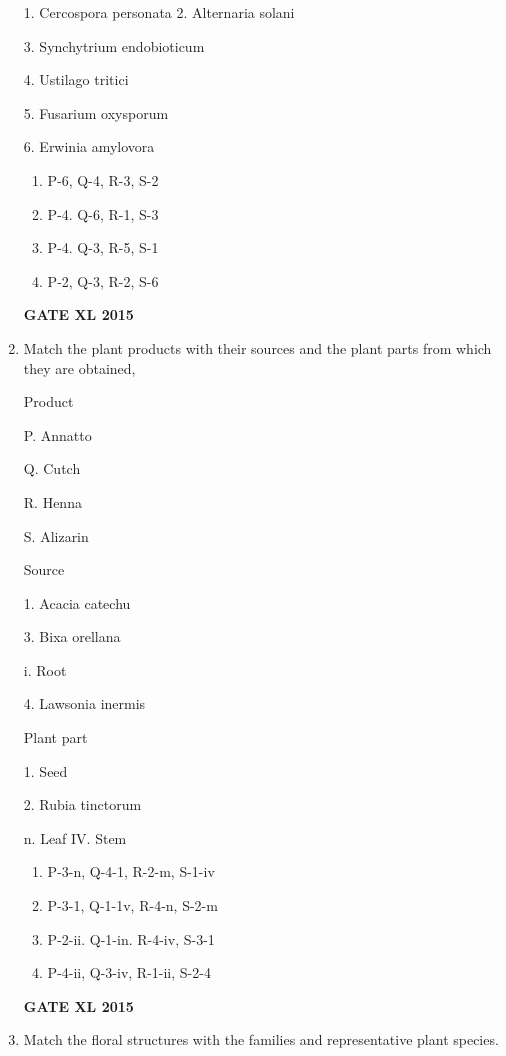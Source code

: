 \documentclass[journal,12pt,onecolumn]{IEEEtran}
\begin{document}
\begin{enumerate}
\begin{minipage}{0.5\textwidth}
\begin{flushleft}
1. Cercospora personata 2. Alternaria solani

3. Synchytrium endobioticum

4. Ustilago tritici

5. Fusarium oxysporum

6. Erwinia amylovora
	\end{flushleft}
\end{minipage}

    \begin{enumerate}
            \item P-6, Q-4, R-3, S-2
	    \item P-4. Q-6, R-1, S-3
	    \item P-4. Q-3, R-5, S-1
            \item P-2, Q-3, R-2, S-6
    \end{enumerate}
\hfill{\textbf{GATE XL 2015}}
\item Match the plant products with their sources and the plant parts from which they are obtained,

\begin{minipage}{0.3\textwidth}
	\begin{flushleft}
Product

P. Annatto

Q. Cutch

R. Henna

S. Alizarin

	\end{flushleft}
\end{minipage}
\begin{minipage}{0.3\textwidth}
	\begin{flushleft}
Source

1. Acacia catechu

3. Bixa orellana

i. Root

4. Lawsonia inermis

	\end{flushleft}
\end{minipage}
\begin{minipage}{0.3\textwidth}
	\begin{flushleft}
Plant part

1. Seed

2. Rubia tinctorum

n. Leaf
IV. Stem
	\end{flushleft}
\end{minipage} 
    \begin{enumerate}
            \item P-3-n, Q-4-1, R-2-m, S-1-iv
	    \item  P-3-1, Q-1-1v, R-4-n, S-2-m
	    \item P-2-ii. Q-1-in. R-4-iv, S-3-1
            \item P-4-ii, Q-3-iv, R-1-ii, S-2-4
    \end{enumerate}
\hfill{\textbf{GATE XL 2015}}
\item Match the floral structures with the families and representative plant species.


\end{enumerate}
\end{document}
